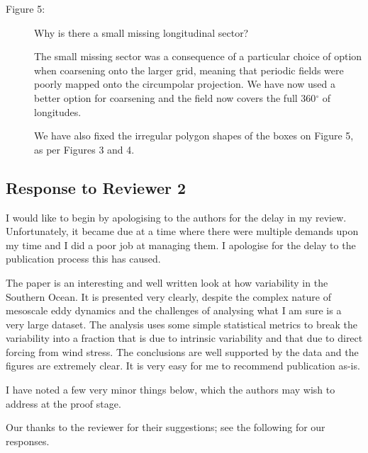 \documentclass[11pt]{article}
\begin{document}
{\begin{description}
\item[Figure 5:] Why is there a small missing longitudinal sector?\\
{\color{black} The small missing sector was a consequence of a particular choice of option when coarsening onto the larger grid, meaning that periodic fields were poorly mapped onto the circumpolar projection.  
We have now used a better option for coarsening and the field now covers the full 360$^\circ$ of longitudes.

We have also fixed the irregular polygon shapes of the boxes on Figure 5, as per Figures 3 and 4.}

\end{description}
}

\newpage

\subsection*{Response to Reviewer 2}

{\color{blue} I would like to begin by apologising to the authors for the delay in my review. Unfortunately, it became due at a time where there were multiple demands upon my time and I did a poor job at managing them. I apologise for the delay to the publication process this has caused.

The paper is an interesting and well written look at how variability in the Southern Ocean. It is presented very clearly, despite the complex nature of mesoscale eddy dynamics and the challenges of analysing what I am sure is a very large dataset. The analysis uses some simple statistical metrics to break the variability into a fraction that is due to intrinsic variability and that due to direct forcing from wind stress. The conclusions are well supported by the data and the figures are extremely clear. It is very easy for me to recommend publication as-is.

I have noted a few very minor things below, which the authors may wish to address at the proof stage.\\}

\noindent Our thanks to the reviewer for their suggestions; see the following for our responses.
\end{document}
